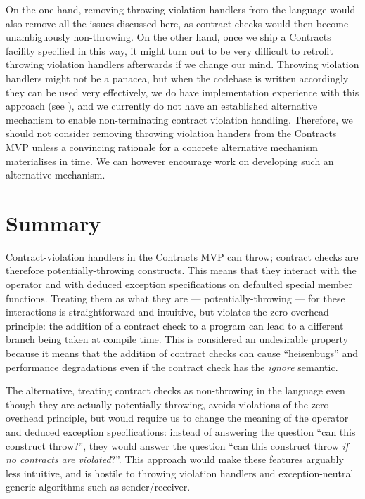 On the one hand, removing throwing violation handlers from the language would also remove all the issues discussed here, as contract checks would then become unambiguously non-throwing. On the other hand, once we ship a Contracts facility specified in this way, it might turn out to be very difficult to retrofit throwing violation handlers afterwards if we change our mind. Throwing violation handlers might not be a panacea, but when the codebase is written accordingly they can be used very effectively, we do have implementation experience with this approach (see \cite{P2698R0}), and we currently do not have an established alternative mechanism to enable non-terminating contract violation handling. Therefore, we should not consider removing throwing violation handers from the Contracts MVP unless a convincing rationale for a concrete alternative mechanism materialises in time. We can however encourage work on developing such an alternative mechanism.

\section{Summary}

Contract-violation handlers in the Contracts MVP can throw; contract checks are therefore potentially-throwing constructs. This means that they interact with the  operator and with deduced exception specifications on defaulted special member functions. Treating them as what they are --- potentially-throwing --- for these interactions is straightforward and intuitive, but violates the zero overhead principle: the addition of a contract check to a program can lead to a different branch being taken at compile time. This is considered an undesirable property because it means that the addition of contract checks can cause ``heisenbugs'' and performance degradations even if the contract check has the \emph{ignore} semantic.

The alternative, treating contract checks as non-throwing in the language even though they are actually potentially-throwing, avoids violations of the zero overhead principle, but would require us to change the meaning of the  operator and deduced exception specifications: instead of answering the question ``can this construct throw?'', they would answer the question ``can this construct throw \emph{if no contracts are violated}?''. This approach would make these features arguably less intuitive, and is hostile to throwing violation handlers and exception-neutral generic algorithms such as sender/receiver.

